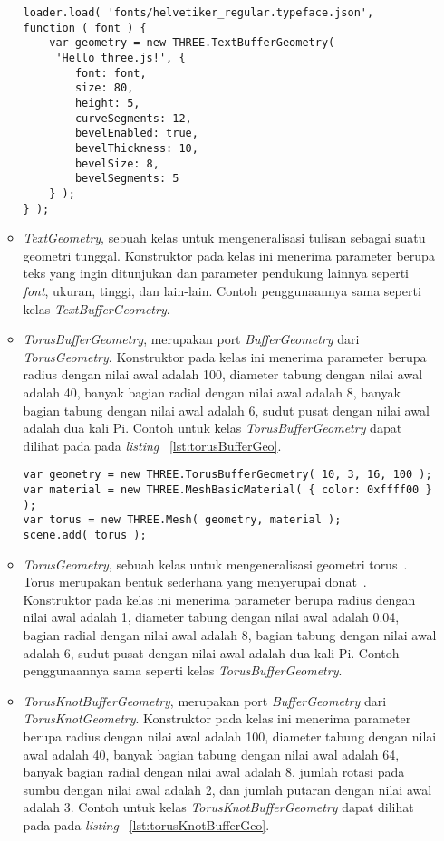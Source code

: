 \begin{itemize}
\begin{itemize}
\begin{lstlisting}[caption={Contoh penggunaan kelas {\it TextBufferGeometry}.}, label={lst:tetrahedronGeo},captionpos=b]
loader.load( 'fonts/helvetiker_regular.typeface.json',
function ( font ) {
	var geometry = new THREE.TextBufferGeometry(
	 'Hello three.js!', {
		font: font,
		size: 80,
		height: 5,
		curveSegments: 12,
		bevelEnabled: true,
		bevelThickness: 10,
		bevelSize: 8,
		bevelSegments: 5
	} );
} );
\end{lstlisting}
		\item {\it TextGeometry},  sebuah kelas untuk mengeneralisasi tulisan sebagai suatu geometri tunggal. Konstruktor pada kelas ini menerima parameter berupa teks yang ingin ditunjukan dan parameter pendukung lainnya seperti {\it font}, ukuran, tinggi, dan lain-lain. Contoh penggunaannya sama seperti kelas {\it TextBufferGeometry}.
		\item {\it TorusBufferGeometry}, merupakan port {\it BufferGeometry} dari {\it TorusGeometry}. Konstruktor pada kelas ini menerima parameter berupa radius dengan nilai awal adalah 100, diameter tabung dengan nilai awal adalah 40, banyak bagian radial dengan nilai awal adalah 8, banyak bagian tabung dengan nilai awal adalah 6, sudut pusat dengan nilai awal adalah dua kali Pi.  Contoh untuk kelas {\it TorusBufferGeometry} dapat dilihat pada pada {\it listing} ~\ref{lst:torusBufferGeo}.
\begin{lstlisting}[caption={Contoh penggunaan kelas {\it TorusBufferGeometry}.}, label={lst:torusBufferGeo},captionpos=b]
var geometry = new THREE.TorusBufferGeometry( 10, 3, 16, 100 );
var material = new THREE.MeshBasicMaterial( { color: 0xffff00 } );
var torus = new THREE.Mesh( geometry, material );
scene.add( torus );
\end{lstlisting}
		\item {\it TorusGeometry}, sebuah kelas untuk mengeneralisasi geometri torus~\cite{threejs}. Torus merupakan bentuk sederhana yang menyerupai donat~\cite{learningThreejs}. Konstruktor pada kelas ini menerima parameter berupa radius dengan nilai awal adalah 1, diameter tabung dengan nilai awal adalah 0.04, bagian radial dengan nilai awal adalah 8, bagian tabung dengan nilai awal adalah 6, sudut pusat dengan nilai awal adalah dua kali Pi.  Contoh penggunaannya sama seperti kelas {\it TorusBufferGeometry}.
		\item {\it TorusKnotBufferGeometry}, merupakan port {\it BufferGeometry} dari {\it TorusKnotGeometry}. Konstruktor pada kelas ini menerima parameter berupa radius dengan nilai awal adalah 100, diameter tabung dengan nilai awal adalah 40, banyak bagian tabung dengan nilai awal adalah 64, banyak bagian radial dengan nilai awal adalah 8, jumlah rotasi pada sumbu dengan nilai awal adalah 2, dan jumlah putaran dengan nilai awal adalah 3. Contoh untuk kelas {\it TorusKnotBufferGeometry} dapat dilihat pada pada {\it listing} ~\ref{lst:torusKnotBufferGeo}.

\end{itemize}
\end{itemize}
